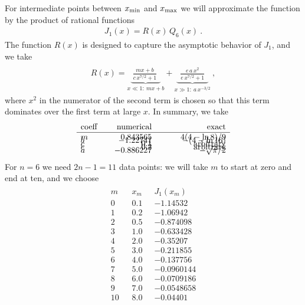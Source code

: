 \documentclass[preprint,12pt,eqsecnum,nofootinbib,amsmath,amssymb]{revtex4}
\begin{document}
For intermediate points between $x_{\rm min}$ and $x_{\rm max}$ 
we will approximate the function by the product of rational functions 
\begin{eqnarray}
  J_1(x) = R(x) \, Q_6(x) \ .
\end{eqnarray}
The function $R(x)$ is designed to capture the
asymptotic behavior of $J_1$, and we take
\begin{eqnarray}
\\\nonumber
  R(x)= 
  \underbrace{~\frac{m x + b}{c\, x^{7/2} + 1}~~}_{x\ll 1:~mx+b}  + 
  \underbrace{~~\frac{e\, a\, x^2}{e\, x^{7/2} +1}~~}_{x\gg 1:~ 
  a\, x^{-3/2}}\ ,
\end{eqnarray}
where $x^2$ in the numerator of the second term is chosen
so that this term dominates over the first term at large $x$.
In summary, we take
\begin{eqnarray}
\begin{array}{lrr}
  {\rm coeff} ~~~ & {\rm numerical} & \hskip2cm {\rm exact}    \\ \hline
  m               &   0.843565            & 4(4-\ln8)/9        \\[-8pt]
  b               &  -1.22741             & -(4-\ln16)         \\[-8pt]
  c               &  0.1                  & {\rm arbitrary}    \\[-8pt]
  e               &  0.2                  & {\rm arbitrary}    \\[-8pt]
  a               & -0.886227             & -\sqrt{\pi}/2 
\end{array}
\end{eqnarray}
%
\noindent
For $n=6$ we need $2n-1=11$ data points: we will take
$m$ to start at zero and end at ten, and we choose 
\begin{eqnarray}
\begin{array}{lll}
  m~~~~ & x_m~~~ & J_1(x_m)   \\ \hline
  0    & 0.1       &   -1.14532     \\[-8pt]
  1    & 0.2       &   -1.06942     \\[-8pt]
  2    & 0.5       &   -0.874098    \\[-8pt]
  3    & 1.0       &   -0.633428    \\[-8pt]
  4    & 2.0       &   -0.35207     \\[-8pt]
  5    & 3.0       &   -0.211855    \\[-8pt]
  6    & 4.0       &   -0.137756    \\[-8pt]
  7    & 5.0       &   -0.0960144   \\[-8pt]
  8    & 6.0       &   -0.0709186   \\[-8pt]
  9    & 7.0       &   -0.0548658   \\[-8pt]
 10    & 8.0       &   -0.04401 
\end{array}
\end{eqnarray}
\end{document}
